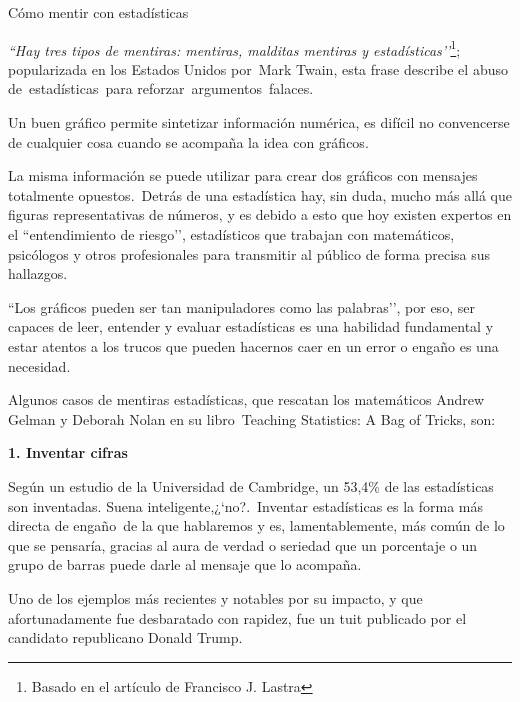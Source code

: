\begin{myexampleblock}{Cómo mentir con estadísticas}

\emph{``Hay tres tipos de mentiras: mentiras, malditas mentiras y estadísticas’’}\footnote{Basado en el artículo de Francisco J. Lastra}; popularizada en los Estados Unidos por Mark Twain, esta frase describe el abuso de estadísticas para reforzar argumentos falaces.

\vspace{2mm} Un buen gráfico permite sintetizar información numérica, es difícil no convencerse de cualquier cosa cuando se acompaña la idea con gráficos. 

\vspace{2mm} La misma información se puede utilizar para crear dos gráficos con mensajes totalmente opuestos. Detrás de una estadística hay, sin duda, mucho más allá que figuras representativas de números, y es debido a esto que hoy existen expertos en el ``entendimiento de riesgo’’, estadísticos que trabajan con matemáticos, psicólogos y otros profesionales para transmitir al público de forma precisa sus hallazgos.

\vspace{2mm} ``Los gráficos pueden ser tan manipuladores como las palabras’’, por eso, ser capaces de leer, entender y evaluar estadísticas es una habilidad fundamental y estar atentos a los trucos que pueden hacernos caer en un error o engaño es una necesidad.

\vspace{2mm} Algunos casos de mentiras estadísticas, que rescatan los matemáticos Andrew Gelman y Deborah Nolan en su libro Teaching Statistics: A Bag of Tricks, son:

\vspace{2mm} \textbf{1. Inventar cifras}

\vspace{2mm} Según un estudio de la Universidad de Cambridge, un 53,4\% de las estadísticas son inventadas. Suena inteligente,¿`no?. Inventar estadísticas es la forma más directa de engaño de la que hablaremos y es, lamentablemente, más común de lo que se pensaría, gracias al aura de verdad o seriedad que un porcentaje o un grupo de barras puede darle al mensaje que lo acompaña.

\vspace{2mm} Uno de los ejemplos más recientes y notables por su impacto, y que afortunadamente fue desbaratado con rapidez, fue un tuit publicado por el candidato republicano Donald Trump.


\end{myexampleblock}
